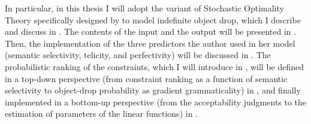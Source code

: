 In particular, in this thesis I will adopt the variant of Stochastic Optimality Theory specifically designed by \textcite{Medina2007} to model indefinite object drop, which I describe and discuss in . The contents of the input and the output will be presented in . Then, the implementation of the three predictors the author used in her model (semantic selectivity, telicity, and perfectivity) will be discussed in . The probabilistic ranking of the constraints, which I will introduce in , will be defined in a top-down perspective (from constraint ranking as a function of semantic selectivity to object-drop probability as gradient grammaticality) in , and finally implemented in a bottom-up perspective (from the acceptability judgments to the estimation of parameters of the linear functions) in .

